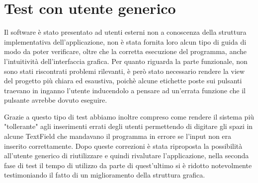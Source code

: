 \documentclass[ 4paper,11pt,openany]{book}
\begin{document}
\section{Test con utente generico}
Il software è stato presentato ad utenti esterni non a conoscenza della struttura implementativa dell'applicazione, non è stata fornita loro alcun tipo di guida di modo da poter verificare, oltre che la corretta esecuzione del programma, anche l'intuitività dell'interfaccia grafica. Per quanto riguarda la parte funzionale, non sono stati riscontrati problemi rilevanti, è però stato necessario rendere la view del progetto più chiara ed esaustiva, poichè alcune etichette poste sui pulsanti traevano in inganno l'utente inducendolo a pensare ad un'errata funzione che il pulsante avrebbe dovuto eseguire. 

Grazie a questo tipo di test abbiamo inoltre compreso come rendere il sistema più "tollerante" agli inserimenti errati degli utenti permettendo di digitare gli spazi in alcune TextField che mandavano il programma in errore se l'input non era inserito correttamente. Dopo queste correzioni è stata riproposta la possibilità all'utente generico di riutilizzare e quindi rivalutare l'applicazione, nella seconda fase di test il tempo di utilizzo da parte di quest'ultimo si è ridotto notevolmente testimoniando il fatto di un miglioramento della struttura grafica.
\end{document}
